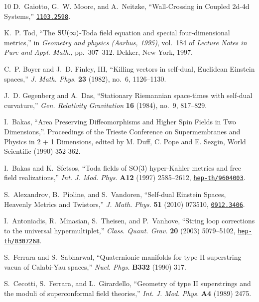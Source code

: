 \documentclass[12pt,reqno]{article}
\numberwithin{equation}{section}
\numberwithin{equation}{section}
\begin{document}
\begin{thebibliography}{10}
D.~Gaiotto, G.~W. Moore, and A.~Neitzke, ``{Wall-Crossing in Coupled 2d-4d
  Systems},''
\href{http://www.arXiv.org/abs/1103.2598}{{\tt 1103.2598}}.

K.~P. Tod, ``The {${\rm SU}(\infty)$}-{T}oda field equation and special
  four-dimensional metrics,'' in {\em Geometry and physics ({A}arhus, 1995)},
  vol.~184 of {\em Lecture Notes in Pure and Appl. Math.}, pp.~307--312.
\newblock Dekker, New York, 1997.

C.~P. Boyer and J.~D. Finley, III, ``Killing vectors in self-dual, {E}uclidean
  {E}instein spaces,'' {\em J. Math. Phys.} {\bf 23} (1982), no.~6, 1126--1130.

J.~D. Gegenberg and A.~Das, ``Stationary {R}iemannian space-times with
  self-dual curvature,'' {\em Gen. Relativity Gravitation} {\bf 16} (1984),
  no.~9, 817--829.

I.~Bakas, ``{Area Preserving Diffeomorphisms and Higher Spin Fields in Two
  Dimensions},''. Proceedings of the Trieste Conference on Supermembranes and
  Physics in 2 + 1 Dimensions, edited by M. Duff, C. Pope and E. Sezgin, World
  Scientific (1990) 352-362.

I.~Bakas and K.~Sfetsos, ``{Toda fields of SO(3) hyper-Kahler metrics and free
  field realizations},'' {\em Int. J. Mod. Phys.} {\bf A12} (1997) 2585--2612,
\href{http://www.arXiv.org/abs/hep-th/9604003}{{\tt hep-th/9604003}}.

S.~Alexandrov, B.~Pioline, and S.~Vandoren, ``{Self-dual Einstein Spaces,
  Heavenly Metrics and Twistors},'' {\em J. Math. Phys.} {\bf 51} (2010)
  073510,
\href{http://www.arXiv.org/abs/0912.3406}{{\tt 0912.3406}}.

I.~Antoniadis, R.~Minasian, S.~Theisen, and P.~Vanhove, ``String loop
  corrections to the universal hypermultiplet,'' {\em Class. Quant. Grav.} {\bf
  20} (2003) 5079--5102,
\href{http://www.arXiv.org/abs/hep-th/0307268}{{\tt hep-th/0307268}}.

S.~Ferrara and S.~Sabharwal, ``{Q}uaternionic manifolds for type {II}
  superstring vacua of {C}alabi-{Y}au spaces,'' {\em Nucl. Phys.} {\bf B332}
  (1990)
317.

S.~Cecotti, S.~Ferrara, and L.~Girardello, ``{G}eometry of type {II}
  superstrings and the moduli of superconformal field theories,'' {\em Int. J.
  Mod. Phys.} {\bf A4} (1989)
2475.


\end{thebibliography}
\end{document}
